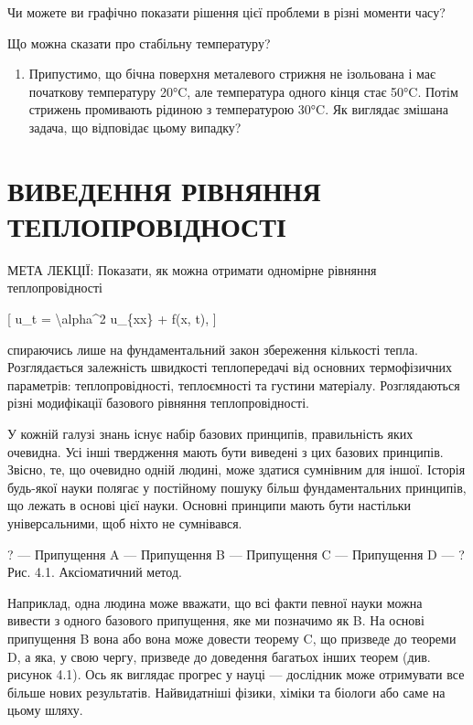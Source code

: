 \documentclass[
]{article}
\providecommand{\tightlist}{%
  \setlength{\itemsep}{0pt}\setlength{\parskip}{0pt}}
\begin{document}
Чи можете ви графічно показати рішення цієї проблеми в різні моменти
часу?

Що можна сказати про стабільну температуру?

\begin{enumerate}
\def\labelenumi{\arabic{enumi}.}
\setcounter{enumi}{3}
\tightlist
\item
  Припустимо, що бічна поверхня металевого стрижня не ізольована і має
  початкову температуру 20°C, але температура одного кінця стає 50°C.
  Потім стрижень промивають рідиною з температурою 30°C. Як виглядає
  змішана задача, що відповідає цьому випадку?
\end{enumerate}

\section{ВИВЕДЕННЯ РІВНЯННЯ
ТЕПЛОПРОВІДНОСТІ}\label{ux432ux438ux432ux435ux434ux435ux43dux43dux44f-ux440ux456ux432ux43dux44fux43dux43dux44f-ux442ux435ux43fux43bux43eux43fux440ux43eux432ux456ux434ux43dux43eux441ux442ux456}

МЕТА ЛЕКЦІЇ: Показати, як можна отримати одномірне рівняння
теплопровідності

{[} u\_t = \textbackslash alpha\^{}2 u\_\{xx\} + f(x, t), {]}

спираючись лише на фундаментальний закон збереження кількості тепла.
Розглядається залежність швидкості теплопередачі від основних
термофізичних параметрів: теплопровідності, теплоємності та густини
матеріалу. Розглядаються різні модифікації базового рівняння
теплопровідності.

У кожній галузі знань існує набір базових принципів, правильність яких
очевидна. Усі інші твердження мають бути виведені з цих базових
принципів. Звісно, те, що очевидно одній людині, може здатися сумнівним
для іншої. Історія будь-якої науки полягає у постійному пошуку більш
фундаментальних принципів, що лежать в основі цієї науки. Основні
принципи мають бути настільки універсальними, щоб ніхто не сумнівався.

? --- Припущення A --- Припущення B --- Припущення C --- Припущення D
--- ? Рис. 4.1. Аксіоматичний метод.

Наприклад, одна людина може вважати, що всі факти певної науки можна
вивести з одного базового припущення, яке ми позначимо як B. На основі
припущення B вона або вона може довести теорему C, що призведе до
теореми D, а яка, у свою чергу, призведе до доведення багатьох інших
теорем (див. рисунок 4.1). Ось як виглядає прогрес у науці --- дослідник
може отримувати все більше нових результатів. Найвидатніші фізики,
хіміки та біологи або саме на цьому шляху.
\end{document}

